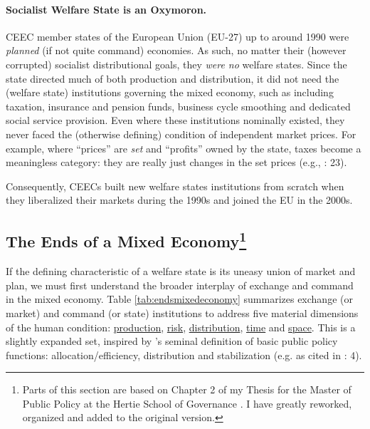 \paragraph{Socialist Welfare State is an Oxymoron.} \gls{CEEC} member states of the European Union (EU-27) up to around 1990 were \emph{planned} (if not quite command) economies. As such, no matter their (however corrupted) socialist distributional goals, they \emph{were no} welfare states. Since the state directed much of both production and distribution, it did not need the (welfare state) institutions governing the mixed economy, such as including taxation, insurance and pension funds, business cycle smoothing and dedicated social service provision. Even where these institutions nominally existed, they never faced the (otherwise defining) condition of independent market prices. For example, where ``prices'' are \emph{set} and ``profits'' owned by the state, taxes become a meaningless category: they are really just changes in the set prices (e.g., \citealt{Bonker2006}: 23).

Consequently, \glspl{CEEC} built new welfare states institutions from scratch when they liberalized their markets during the 1990s and joined the EU in the 2000s. %

\subsection[Ends]{The Ends of a Mixed Economy\footnote{
	Parts of this section are based on Chapter 2 of my Thesis for the Master of Public Policy at the Hertie School of Governance \citep{Held2010a}. I have greatly reworked, organized and added to the original version.}} \label{sec:ends}
If the defining characteristic of a welfare state is its uneasy union of market and plan, we must first understand the broader interplay of exchange and command in the mixed economy. Table \ref{tab:endsmixedeconomy} summarizes exchange (or market) and command (or state) institutions to address five material dimensions of the human condition: \hyperref[sec:production]{production}, \hyperref[sec:risk]{risk}, \hyperref[sec:distribution]{distribution}, \hyperref[sec:time]{time} and \hyperref[sec:space]{space}. This is a slightly expanded set, inspired by \citeauthor{MusgThet1959}'s \citeyearpar{MusgThet1959} seminal definition of basic public policy functions: allocation/efficiency, distribution and stabilization (e.g. as cited in \citealt{Bordo2011}: 4).


